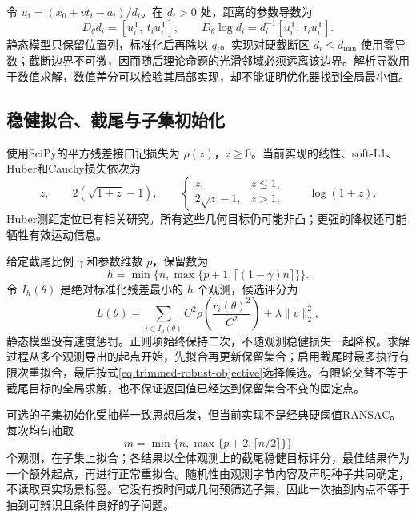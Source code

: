 令 $u_i=(x_0+vt_i-a_i)/d_i$。在 $d_i>0$ 处，距离的参数导数为
\begin{equation}
 D_\theta d_i=[u_i^{\mathsf T},\ t_i u_i^{\mathsf T}],
 \qquad
 D_\theta\log d_i=d_i^{-1}[u_i^{\mathsf T},\ t_i u_i^{\mathsf T}].
 \label{eq:range-jacobian}
\end{equation}
静态模型只保留位置列，标准化后再除以 $q_i$。实现对硬截断区 $d_i\leq d_{\min}$ 使用零导数；截断边界不可微，因而随后理论命题的光滑邻域必须远离该边界。解析导数用于数值求解，数值差分可以检验其局部实现，却不能证明优化器找到全局最小值。

\subsection{稳健拟合、截尾与子集初始化}

使用SciPy的平方残差接口记损失为 $\rho(z)$，$z\geq0$。当前实现的线性、soft-L1、Huber和Cauchy损失依次为
\begin{equation}
 z,\qquad 2(\sqrt{1+z}-1),\qquad
 \begin{cases}z,&z\leq1,\\2\sqrt z-1,&z>1,\end{cases}
 \qquad \log(1+z).
 \label{eq:loss-family}
\end{equation}
Huber测距定位已有相关研究\cite{soares2016badapples}。所有这些几何目标仍可能非凸；更强的降权还可能牺牲有效运动信息。

给定截尾比例 $\gamma$ 和参数维数 $p$，保留数为
\begin{equation}
 h=\min\{n,\max\{p+1,\lceil(1-\gamma)n\rceil\}\}.
\end{equation}
令 $I_h(\theta)$ 是绝对标准化残差最小的 $h$ 个观测，候选评分为
\begin{equation}
 L(\theta)=\sum_{i\in I_h(\theta)}
 C^2\rho\left(\frac{r_i(\theta)^2}{C^2}\right)
 +\lambda\|v\|_2^2,
 \label{eq:trimmed-robust-objective}
\end{equation}
静态模型没有速度惩罚。正则项始终保持二次，不随观测稳健损失一起降权。求解过程从多个观测导出的起点开始，先拟合再更新保留集合；启用截尾时最多执行有限次重拟合，最后按式\eqref{eq:trimmed-robust-objective}选择候选。有限轮交替不等于截尾目标的全局求解，也不保证返回值已经达到保留集合不变的固定点。

可选的子集初始化受抽样一致思想启发\cite{fischler1981random}，但当前实现不是经典硬阈值RANSAC。每次均匀抽取
\begin{equation}
 m=\min\{n,\max\{p+2,\lceil n/2\rceil\}\}
\end{equation}
个观测，在子集上拟合；各结果以全体观测上的截尾稳健目标评分，最佳结果作为一个额外起点，再进行正常重拟合。随机性由观测字节内容及声明种子共同确定，不读取真实场景标签。它没有按时间或几何预筛选子集，因此一次抽到内点不等于抽到可辨识且条件良好的子问题。

